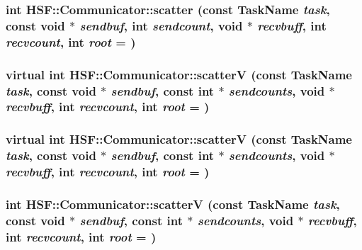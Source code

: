 \label{classHSF_1_1Communicator_ad7b0160f042fe3574068ca4ffd344fbd}
\hypertarget{classHSF_1_1Communicator_a421c23c24d63ffc349d4e5d44c9fea43}{
\subsubsection[{scatter}]{\setlength{\rightskip}{0pt plus 5cm}int HSF::Communicator::scatter (const {\bf TaskName} {\em task}, \/  const void $\ast$ {\em sendbuf}, \/  int {\em sendcount}, \/  void $\ast$ {\em recvbuff}, \/  int {\em recvcount}, \/  int {\em root} = {})}}
\label{classHSF_1_1Communicator_a421c23c24d63ffc349d4e5d44c9fea43}
\hypertarget{classHSF_1_1Communicator_ad9f7ec0244f1400f0ab12da93d4d7692}{
\subsubsection[{scatterV}]{\setlength{\rightskip}{0pt plus 5cm}virtual int HSF::Communicator::scatterV (const {\bf TaskName} {\em task}, \/  const void $\ast$ {\em sendbuf}, \/  const int $\ast$ {\em sendcounts}, \/  void $\ast$ {\em recvbuff}, \/  int {\em recvcount}, \/  int {\em root} = {})}}
\label{classHSF_1_1Communicator_ad9f7ec0244f1400f0ab12da93d4d7692}
\hypertarget{classHSF_1_1Communicator_ad9f7ec0244f1400f0ab12da93d4d7692}{
\subsubsection[{scatterV}]{\setlength{\rightskip}{0pt plus 5cm}virtual int HSF::Communicator::scatterV (const {\bf TaskName} {\em task}, \/  const void $\ast$ {\em sendbuf}, \/  const int $\ast$ {\em sendcounts}, \/  void $\ast$ {\em recvbuff}, \/  int {\em recvcount}, \/  int {\em root} = {})}}
\label{classHSF_1_1Communicator_ad9f7ec0244f1400f0ab12da93d4d7692}
\hypertarget{classHSF_1_1Communicator_a1678c6aa967e7aa1a54f760c8e6abeaa}{
\subsubsection[{scatterV}]{\setlength{\rightskip}{0pt plus 5cm}int HSF::Communicator::scatterV (const {\bf TaskName} {\em task}, \/  const void $\ast$ {\em sendbuf}, \/  const int $\ast$ {\em sendcounts}, \/  void $\ast$ {\em recvbuff}, \/  int {\em recvcount}, \/  int {\em root} = {})}}
